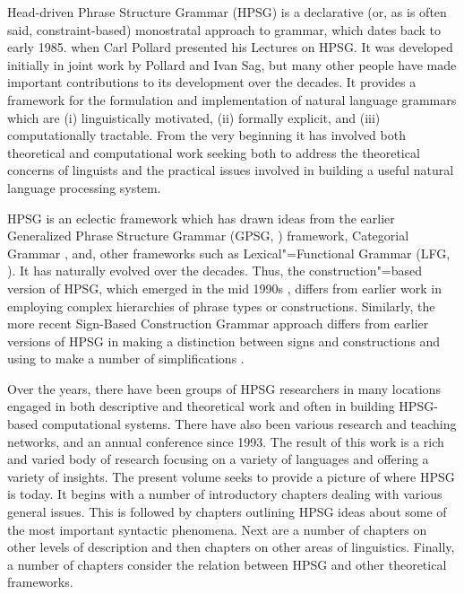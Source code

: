 \begin{refsection}

Head-driven Phrase Structure Grammar (HPSG) is a declarative (or, as is often said,
constraint-based) monostratal approach to grammar, which dates back to early 1985. when Carl Pollard
presented his Lectures on HPSG. It was developed initially in joint work by Pollard and Ivan Sag,
but many other people have made important contributions to its development over the decades. It
provides a framework for the formulation and implementation of natural language grammars which are
(i) linguistically motivated, (ii) formally explicit, and (iii) computationally tractable. From the
very beginning it has involved both theoretical and computational work seeking both to address the
theoretical concerns of linguists and the practical issues involved in building a useful natural
language processing system.

HPSG is an eclectic framework which has drawn ideas from the earlier Generalized Phrase Structure
Grammar (GPSG, \citealp{GKPS85a}) framework, Categorial Grammar \citep{Ajdukiewicz35a-u}, and, other frameworks such as Lexical"=Functional
Grammar (LFG, \citealp{Bresnan82a-ed}). It has naturally evolved over the decades. Thus, the construction"=based version of
HPSG, which emerged in the mid 1990s \citep{Sag97a,GSag2000a-u}, differs from earlier work
\citep{ps,ps2} in employing complex hierarchies of phrase types or
constructions. Similarly, the more recent Sign-Based Construction Grammar approach differs from
earlier versions of HPSG in making a distinction between signs and constructions and using to make a
number of simplifications \citep{Sag2012a}.

Over the years, there have been groups of HPSG researchers in many locations engaged in both
descriptive and theoretical work and often in building HPSG-based computational systems. There have
also been various research and teaching networks, and an annual conference since 1993. The result of
this work is a rich and varied body of research focusing on a variety of languages and offering a
variety of insights. The present volume seeks to provide a picture of where HPSG is today. It begins
with a number of introductory chapters dealing with various general issues. This is followed by
chapters outlining HPSG ideas about some of the most important syntactic phenomena. Next are a
number of chapters on other levels of description and then chapters on other areas of
linguistics. Finally, a number of chapters consider the relation between HPSG and other theoretical
frameworks.


\end{refsection}
